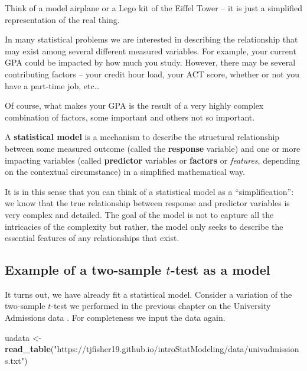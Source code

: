 \documentclass[
]{book}
\newenvironment{Shaded}{\begin{snugshade}}{\end{snugshade}}
\newcommand{\FunctionTok}[1]{\textcolor[rgb]{0.13,0.29,0.53}{\textbf{#1}}}
\newcommand{\NormalTok}[1]{#1}
\newcommand{\OtherTok}[1]{\textcolor[rgb]{0.56,0.35,0.01}{#1}}
\newcommand{\StringTok}[1]{\textcolor[rgb]{0.31,0.60,0.02}{#1}}
\begin{document}
Think of a model airplane or a Lego kit of the Eiffel Tower -- it is just a simplified representation of the real thing.

In many statistical problems we are interested in describing the relationship that may exist among several different measured variables.
For example, your current GPA could be impacted by how much you study.
However, there may be several contributing factors -- your credit hour load, your ACT score, whether or not you have a part-time job, etc\ldots{}

Of course, what makes your GPA is the result of a very highly complex combination of factors, some important and others not so important.

A \textbf{statistical model} is a mechanism to describe the structural relationship between some measured outcome (called the \textbf{response} variable) and one or more impacting variables (called \textbf{predictor} variables or \textbf{factors} or \emph{features}, depending on the contextual circumstance) in a simplified mathematical way.

It is in this sense that you can think of a statistical model as a ``simplification'': we know that the true relationship between response and predictor variables is very complex and detailed.
The goal of the model is not to capture all the intricacies of the complexity but rather, the model only seeks to describe the essential features of any relationships that exist.

\hypertarget{example-of-a-two-sample-t-test-as-a-model}{%
\subsection{\texorpdfstring{Example of a two-sample \(t\)-test as a model}{Example of a two-sample t-test as a model}}\label{example-of-a-two-sample-t-test-as-a-model}}

It turns out, we have already fit a statistical model.
Consider a variation of the two-sample \(t\)-test we performed in the previous chapter on the University Admissions data \citep{KutnerText}.
For completeness we input the data again.

\begin{Shaded}
\begin{Highlighting}[]
\NormalTok{uadata }\OtherTok{\textless{}{-}} \FunctionTok{read\_table}\NormalTok{(}\StringTok{"https://tjfisher19.github.io/introStatModeling/data/univadmissions.txt"}\NormalTok{)}
\end{Highlighting}
\end{Shaded}
\end{document}
